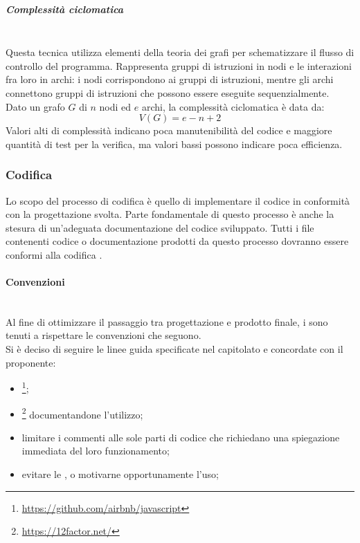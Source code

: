 \subparagraph{Complessità ciclomatica}\mbox{}\\
Questa tecnica utilizza elementi della teoria dei grafi per schematizzare il flusso di controllo del programma. Rappresenta gruppi di istruzioni in nodi e le interazioni fra loro in archi: i nodi corrispondono ai gruppi di istruzioni, mentre gli archi connettono gruppi di istruzioni che possono essere eseguite sequenzialmente.\\
Dato un grafo $G$ di $n$ nodi ed $e$ archi, la complessità ciclomatica è data da:
\[ V\left(G\right) = e - n + 2 \]
Valori alti di complessità indicano poca manutenibilità del codice e maggiore quantità di test per la verifica, ma valori bassi possono indicare poca efficienza.

\subsubsection{Codifica}\label{Codifica}
Lo scopo del processo di codifica è quello di implementare il codice in conformità con la progettazione svolta. Parte fondamentale di questo processo è anche la stesura di un'adeguata documentazione del codice sviluppato. Tutti i file contenenti codice o documentazione prodotti da questo processo dovranno essere conformi alla codifica .

\paragraph{Convenzioni} \label{sec:convenzioni}\mbox{}\\
Al fine di ottimizzare il passaggio tra progettazione e prodotto finale, i \Programmatori{} sono tenuti a rispettare le convenzioni che seguono.\\
Si è deciso di seguire le linee guida specificate nel capitolato e concordate con il proponente:
\begin{itemize}
	\item {}\footnote{\url{https://github.com/airbnb/javascript}};
	\item {}\footnote{\url{https://12factor.net/}} documentandone l'utilizzo;
	\item limitare i commenti alle sole parti di codice che richiedano una spiegazione immediata del loro funzionamento;
	\item evitare le , o motivarne opportunamente l’uso;
\end{itemize}

